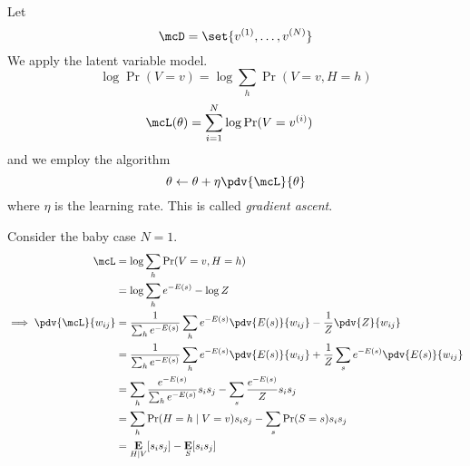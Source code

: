 Let \[
    \mcD = \set{v^{(1)}, \dots, v^{(N)}}
\]
We apply the latent variable model.
\[
    \log \Pr(V = v) = \log \sum_h \Pr(V = v, H = h)
\]
\begin{align*}
    \mcL(\theta) &= \sum_{i=1}^N \log \Pr(V = v^{(i)})
\end{align*} and we employ the algorithm \[
    \theta \gets \theta + \eta \pdv{\mcL}{\theta}
\] where $\eta$ is the learning rate.
This is called \emph{gradient ascent}.

Consider the baby case $N = 1$.
\begin{align*}
    \mcL &= \log \sum_h \Pr(V = v, H = h) \\
      &= \log \sum_h e^{-E(s)} - \log Z \\
    \implies \pdv{\mcL}{w_{ij}}
    &= \frac1{\sum_h e^{-E(s)}}
            \sum_h e^{-E(s)} \pdv{E(s)}{w_{ij}}
        - \frac1Z \pdv{Z}{w_{ij}} \\
    &= \frac1{\sum_h e^{-E(s)}} \sum_h e^{-E(s)} \pdv{E(s)}{w_{ij}}
        + \frac1Z \sum_s e^{-E(s)} \pdv{E(s)}{w_{ij}} \\
    &= \sum_h \frac{e^{-E(s)}}{\sum_h e^{-E(s)}} s_i s_j
        - \sum_s \frac{e^{-E(s)}}{Z} s_i s_j \\
    &= \sum_h \Pr(H = h \given V = v) s_i s_j
        - \sum_s \Pr(S = s) s_i s_j \\
    &= \E_{H \given V}[s_i s_j] - \E_S[s_i s_j]
\end{align*}
